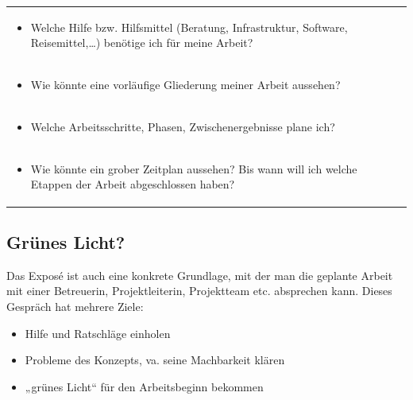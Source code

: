 \documentclass[]{book}
\providecommand{\tightlist}{%
  \setlength{\itemsep}{0pt}\setlength{\parskip}{0pt}}
\theoremstyle{definition}
\theoremstyle{definition}
\theoremstyle{definition}
\theoremstyle{remark}
\begin{document}
\begin{longtable}[]{@{}l@{}}
\begin{minipage}[t]{0.97\columnwidth}
\begin{itemize}
\tightlist
\item
  Welche Hilfe bzw. Hilfsmittel (Beratung, Infrastruktur, Software,
  Reisemittel,\ldots{}) benötige ich für meine Arbeit? \vspace{-6mm}
\end{itemize}\strut
\end{minipage}\tabularnewline
\begin{minipage}[t]{0.97\columnwidth}\raggedright\strut
\begin{itemize}
\tightlist
\item
  Wie könnte eine vorläufige Gliederung meiner Arbeit aussehen?
  \vspace{-6mm}
\end{itemize}\strut
\end{minipage}\tabularnewline
\begin{minipage}[t]{0.97\columnwidth}\raggedright\strut
\begin{itemize}
\tightlist
\item
  Welche Arbeitsschritte, Phasen, Zwischenergebnisse plane ich?
  \vspace{-6mm}
\end{itemize}\strut
\end{minipage}\tabularnewline
\begin{minipage}[t]{0.97\columnwidth}\raggedright\strut
\begin{itemize}
\tightlist
\item
  Wie könnte ein grober Zeitplan aussehen? Bis wann will ich welche
  Etappen der Arbeit abgeschlossen haben?
\end{itemize}\strut
\end{minipage}\tabularnewline
\bottomrule
\end{longtable}

\subsection{Grünes Licht?}\label{grunes-licht}

Das Exposé ist auch eine konkrete Grundlage, mit der man die geplante
Arbeit mit einer Betreuerin, Projektleiterin, Projektteam etc.
absprechen kann. Dieses Gespräch hat mehrere Ziele:

\begin{itemize}
\tightlist
\item
  Hilfe und Ratschläge einholen
\item
  Probleme des Konzepts, va. seine Machbarkeit klären
\item
  „grünes Licht`` für den Arbeitsbeginn bekommen
\end{itemize}
\end{document}
